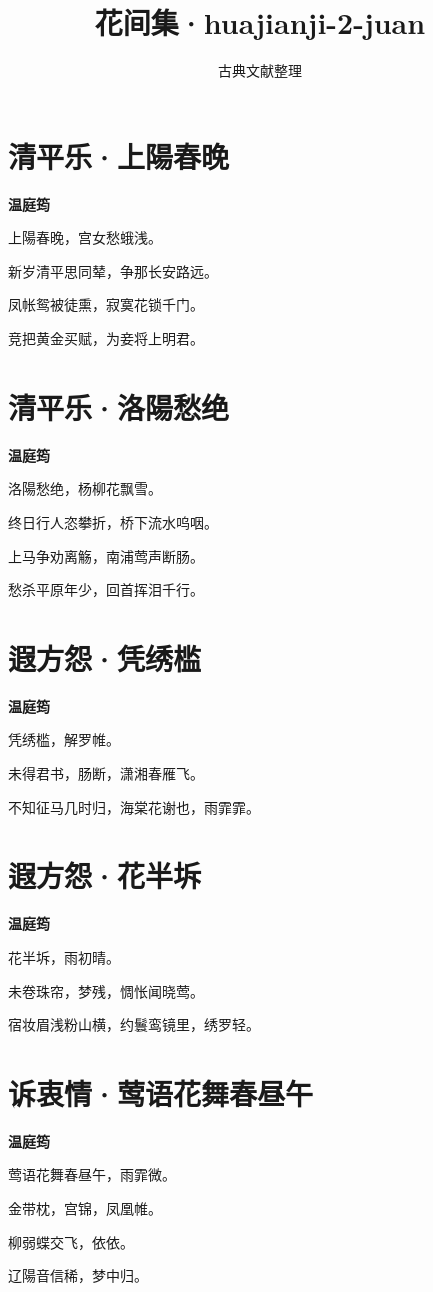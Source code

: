 \documentclass[12pt,a4paper]{ctexbook}
\title{花间集·huajianji-2-juan}
\author{古典文献整理}
\date{}
\begin{document}
\maketitle
\tableofcontents
\newpage
\section{清平乐·上陽春晚}
\textbf{温庭筠}\par\vspace{0.5em}
上陽春晚，宫女愁蛾浅。\par
新岁清平思同辇，争那长安路远。\par
凤帐鸳被徒熏，寂寞花锁千门。\par
竞把黄金买赋，为妾将上明君。\par

\section{清平乐·洛陽愁绝}
\textbf{温庭筠}\par\vspace{0.5em}
洛陽愁绝，杨柳花飘雪。\par
终日行人恣攀折，桥下流水呜咽。\par
上马争劝离觞，南浦莺声断肠。\par
愁杀平原年少，回首挥泪千行。\par

\section{遐方怨·凭绣槛}
\textbf{温庭筠}\par\vspace{0.5em}
凭绣槛，解罗帷。\par
未得君书，肠断，潇湘春雁飞。\par
不知征马几时归，海棠花谢也，雨霏霏。\par

\section{遐方怨·花半坼}
\textbf{温庭筠}\par\vspace{0.5em}
花半坼，雨初晴。\par
未卷珠帘，梦残，惆怅闻晓莺。\par
宿妆眉浅粉山横，约鬟鸾镜里，绣罗轻。\par

\section{诉衷情·莺语花舞春昼午}
\textbf{温庭筠}\par\vspace{0.5em}
莺语花舞春昼午，雨霏微。\par
金带枕，宫锦，凤凰帷。\par
柳弱蝶交飞，依依。\par
辽陽音信稀，梦中归。\par
\end{document}
